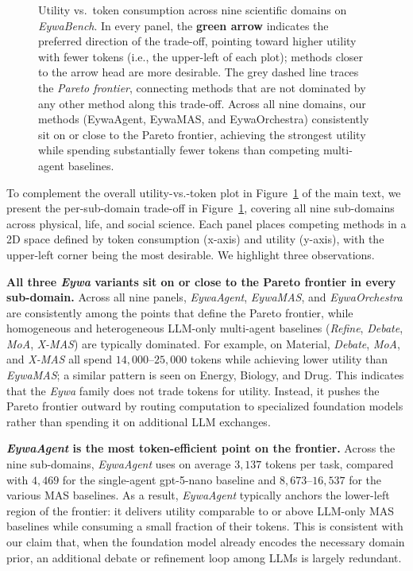 \documentclass{llmxive}
\begin{document}
{\begin{figure}[t]
\caption{Utility vs.\ token consumption across nine scientific domains on \textit{EywaBench}. In every panel, the \textbf{green arrow} indicates the preferred direction of the trade-off, pointing toward higher utility with fewer tokens (i.e., the upper-left of each plot); methods closer to the arrow head are more desirable. The grey dashed line traces the \emph{Pareto frontier}, connecting methods that are not dominated by any other method along this trade-off. Across all nine domains, our methods (EywaAgent, EywaMAS, and EywaOrchestra) consistently sit on or close to the Pareto frontier, achieving the strongest utility while spending substantially fewer tokens than competing multi-agent baselines.}
\label{fig:tradeoff_per_domain}
\vspace{-3mm}
\end{figure}


To complement the overall utility-vs.-token plot in Figure~\ref{fig:tradeoff_per_domain} of the main text, we present the per-sub-domain trade-off in Figure~\ref{fig:tradeoff_per_domain}, covering all nine sub-domains across physical, life, and social science. Each panel places competing methods in a 2D space defined by token consumption (x-axis) and utility (y-axis), with the upper-left corner being the most desirable. We highlight three observations.
 
\textbf{All three \textit{Eywa} variants sit on or close to the Pareto frontier in every sub-domain.} Across all nine panels, \textit{EywaAgent}, \textit{EywaMAS}, and \textit{EywaOrchestra} are consistently among the points that define the Pareto frontier, while homogeneous and heterogeneous LLM-only multi-agent baselines (\textit{Refine}, \textit{Debate}, \textit{MoA}, \textit{X-MAS}) are typically dominated. For example, on Material, \textit{Debate}, \textit{MoA}, and \textit{X-MAS} all spend $14{,}000$--$25{,}000$ tokens while achieving lower utility than \textit{EywaMAS}; a similar pattern is seen on Energy, Biology, and Drug. This indicates that the \textit{Eywa} family does not trade tokens for utility. Instead, it pushes the Pareto frontier outward by routing computation to specialized foundation models rather than spending it on additional LLM exchanges.
 
\textbf{\textit{EywaAgent} is the most token-efficient point on the frontier.} Across the nine sub-domains, \textit{EywaAgent} uses on average $3{,}137$ tokens per task, compared with $4{,}469$ for the single-agent gpt-5-nano baseline and $8{,}673$--$16{,}537$ for the various MAS baselines. As a result, \textit{EywaAgent} typically anchors the lower-left region of the frontier: it delivers utility comparable to or above LLM-only MAS baselines while consuming a small fraction of their tokens. This is consistent with our claim that, when the foundation model already encodes the necessary domain prior, an additional debate or refinement loop among LLMs is largely redundant.
 
}
\end{document}

